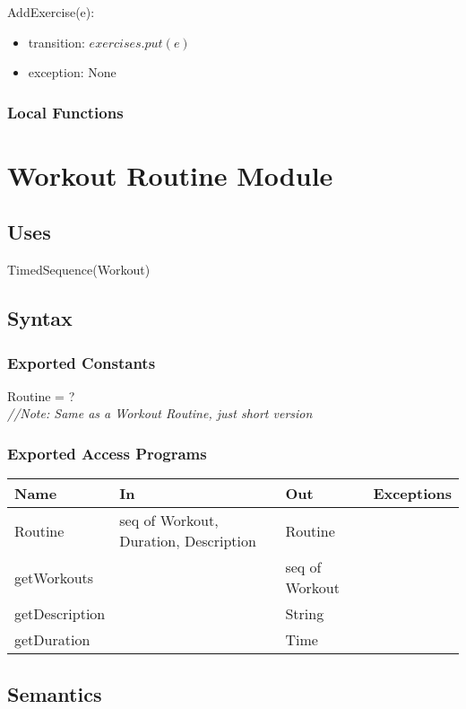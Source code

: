 \documentclass[12pt, titlepage]{article}
\begin{document}
AddExercise(e):
\begin{itemize}
	\item transition: $exercises.put(e)$
	\item exception: None
\end{itemize}

\subsubsection{Local Functions}

\newpage

\section{Workout Routine Module}

\subsection{Uses}
TimedSequence(Workout)
\subsection{Syntax}

\subsubsection{Exported Constants}
Routine = ? \\
\textit{//Note: Same as a Workout Routine, just short version}
\subsubsection{Exported Access Programs}

\begin{center}
	\begin{tabular}{p{2cm} p{4cm} p{4cm} p{2cm}}
		\hline
		\textbf{Name} & \textbf{In} & \textbf{Out} & \textbf{Exceptions} \\
		\hline
		Routine & seq of Workout, Duration, Description & Routine &  \\
		getWorkouts &  & seq of Workout &  \\
		getDescription &  & String &  \\
		getDuration &  & Time &  \\
		\hline
	\end{tabular}
\end{center}

\subsection{Semantics}
\end{document}
